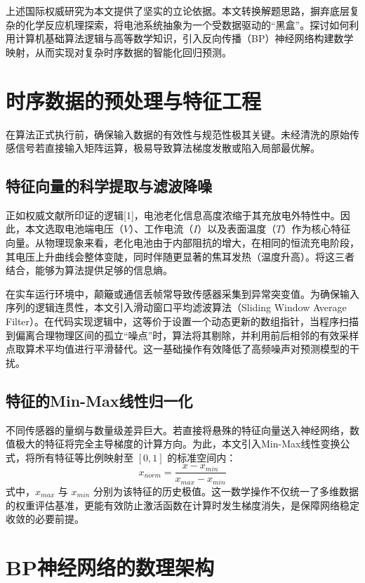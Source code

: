 \documentclass[a4paper,10.5pt]{article}
\begin{document}
上述国际权威研究为本文提供了坚实的立论依据。本文转换解题思路，摒弃底层复杂的化学反应机理探索，将电池系统抽象为一个受数据驱动的“黑盒”。探讨如何利用计算机基础算法逻辑与高等数学知识，引入反向传播（BP）神经网络构建数学映射，从而实现对复杂时序数据的智能化回归预测。

\section{时序数据的预处理与特征工程}

在算法正式执行前，确保输入数据的有效性与规范性极其关键。未经清洗的原始传感信号若直接输入矩阵运算，极易导致算法梯度发散或陷入局部最优解。

\subsection{特征向量的科学提取与滤波降噪}
正如权威文献所印证的逻辑[1]，电池老化信息高度浓缩于其充放电外特性中。因此，本文选取电池端电压（$V$）、工作电流（$I$）以及表面温度（$T$）作为核心特征向量。从物理现象来看，老化电池由于内部阻抗的增大，在相同的恒流充电阶段，其电压上升曲线会整体变陡，同时伴随更显著的焦耳发热（温度升高）。将这三者结合，能够为算法提供足够的信息熵。

在实车运行环境中，颠簸或通信丢帧常导致传感器采集到异常突变值。为确保输入序列的逻辑连贯性，本文引入滑动窗口平均滤波算法（Sliding Window Average Filter）。在代码实现逻辑中，这等价于设置一个动态更新的数组指针，当程序扫描到偏离合理物理区间的孤立“噪点”时，算法将其剔除，并利用前后相邻的有效采样点取算术平均值进行平滑替代。这一基础操作有效降低了高频噪声对预测模型的干扰。

\subsection{特征的Min-Max线性归一化}
不同传感器的量纲与数量级差异巨大。若直接将悬殊的特征向量送入神经网络，数值极大的特征将完全主导梯度的计算方向。为此，本文引入Min-Max线性变换公式，将所有特征等比例映射至 $[0,1]$ 的标准空间内：
\begin{equation}
    x_{norm}=\frac{x-x_{min}}{x_{max}-x_{min}}
\end{equation}
式中，$x_{max}$ 与 $x_{min}$ 分别为该特征的历史极值。这一数学操作不仅统一了多维数据的权重评估基准，更能有效防止激活函数在计算时发生梯度消失，是保障网络稳定收敛的必要前提。

\section{BP神经网络的数理架构}
\end{document}
